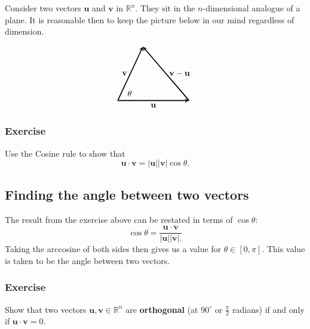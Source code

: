 \documentclass[a4paper,12pt]{amsart}
\begin{document}
    Consider two vectors $\mathbf{u}$ and $\mathbf{v}$ in $\mathbb{R}^n$. They sit in the $n$-dimensional analogue of a plane. It is reasonable then to keep the picture below in our mind regardless of dimension.

    \[
        \begin{tikzpicture}[vector/.style={-stealth,very thick}]
            \coordinate (O) at (0,0);
            \coordinate (A) at (3,0);
            \coordinate (B) at (65:2.5);

            \draw[vector] (O) -- (A) node[midway,below] {$\mathbf{u}$};
            \draw[vector] (O) -- (B) node[midway,left] {$\mathbf{v}$};
            \draw[vector] (A) -- (B) node[midway,right] {$\mathbf{v-u}$};
            \node at (0.5,0.3) {$\theta$};
        \end{tikzpicture}
    \]

    \subsubsection{Exercise} Use the Cosine rule to show that
    \[ \mathbf{u} \cdot \mathbf{v} = |\mathbf{u}| | \mathbf{v}| \cos{\theta}. \]

    \subsection{Finding the angle between two vectors} The result from the exercise above can be restated in terms of $\cos{\theta}$:
    \[ \cos{\theta} = \frac{\mathbf{u} \cdot \mathbf{v}}{|\mathbf{u}||\mathbf{v}|.} \]
    Taking the arccosine of both sides then gives us a value for $\theta \in [0, \pi]$. This value is taken to be the angle between two vectors.

    \subsubsection{Exercise} Show that two vectors $\mathbf{u}, \mathbf{v} \in \mathbb{R}^n$ are \textbf{orthogonal} (at $90^\circ$ or $\frac{\pi}{2}$ radians)  if and only if $\mathbf{u} \cdot \mathbf{v} = 0$.
\end{document}
